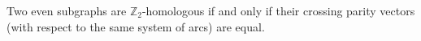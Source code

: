\documentclass[letterpaper,review]{siamart190516}
\def\Z{\mathbb{Z}}
\def\modified#1{\color{blue}#1 \color{black}}
\def\anote#1{\color{purple}Amir: #1 \color{black}}
\def\enote#1{\textcolor{magenta}{Erin: #1}}
\begin{document}
%
 
\begin{lemma}
Two even subgraphs are $\Z_2$-homologous if and only if their crossing parity vectors (with respect to the same system of arcs) are equal.
\end{lemma}
\end{document}
